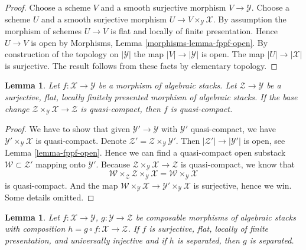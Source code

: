 \documentclass{stacks-project}
\theoremstyle{plain}
\newtheorem{lemma}[subsection]{Lemma}
\theoremstyle{definition}
\theoremstyle{remark}
\numberwithin{equation}{subsection}
\begin{document}
\begin{proof}
Choose a scheme $V$ and a smooth surjective morphism $V \to \mathcal{Y}$.
Choose a scheme $U$ and a smooth surjective morphism
$U \to V \times_\mathcal{Y} \mathcal{X}$. By assumption the morphism
of schemes $U \to V$ is flat and locally of finite presentation.
Hence $U \to V$ is open by
Morphisms, Lemma \ref{morphisms-lemma-fppf-open}.
By construction of the topology on $|\mathcal{Y}|$ the map
$|V| \to |\mathcal{Y}|$ is open.
The map $|U| \to |\mathcal{X}|$ is surjective.
The result follows from these facts by elementary topology.
\end{proof}

\begin{lemma}
\label{lemma-descent-quasi-compact}
Let $f : \mathcal{X} \to \mathcal{Y}$ be a morphism of algebraic stacks.
Let $\mathcal{Z} \to \mathcal{Y}$ be a surjective, flat, locally finitely
presented morphism of algebraic stacks. If the base change
$\mathcal{Z} \times_\mathcal{Y} \mathcal{X} \to \mathcal{Z}$
is quasi-compact, then $f$ is quasi-compact.
\end{lemma}

\begin{proof}
We have to show that given $\mathcal{Y}' \to \mathcal{Y}$
with $\mathcal{Y}'$ quasi-compact, we have
$\mathcal{Y}' \times_\mathcal{Y} \mathcal{X}$ is quasi-compact.
Denote $\mathcal{Z}' = \mathcal{Z} \times_\mathcal{Y} \mathcal{Y}'$.
Then $|\mathcal{Z}'| \to |\mathcal{Y}'|$ is open, see
Lemma \ref{lemma-fppf-open}. Hence we can find a quasi-compact
open substack $\mathcal{W} \subset \mathcal{Z}'$ mapping onto
$\mathcal{Y}'$. Because
$\mathcal{Z} \times_\mathcal{Y} \mathcal{X} \to \mathcal{Z}$
is quasi-compact, we know that
$$
\mathcal{W} \times_\mathcal{Z} \mathcal{Z} \times_\mathcal{Y} \mathcal{X} =
\mathcal{W} \times_\mathcal{Y} \mathcal{X}
$$
is quasi-compact. And the map
$\mathcal{W} \times_\mathcal{Y} \mathcal{X} \to
\mathcal{Y}' \times_\mathcal{Y} \mathcal{X}$
is surjective, hence we win. Some details omitted.
\end{proof}

\begin{lemma}
\label{lemma-check-separated-on-ui-cover}
Let $f : \mathcal{X} \to \mathcal{Y}$, $g : \mathcal{Y} \to \mathcal{Z}$
be composable morphisms of algebraic stacks with composition
$h = g \circ f : \mathcal{X} \to \mathcal{Z}$.
If $f$ is surjective, flat, locally of finite presentation,
and universally injective and if $h$ is separated, then
$g$ is separated.
\end{lemma}
\end{document}
